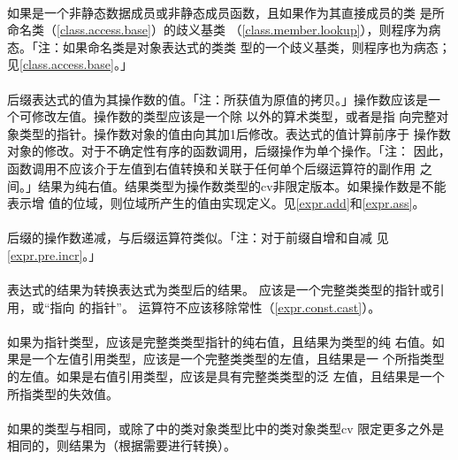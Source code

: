 \paragraph{}
如果是一个非静态数据成员或非静态成员函数，且如果作为其直接成员的类
是所命名类（\ref{class.access.base}）的歧义基类
（\ref{class.member.lookup}），则程序为病态。「注：如果命名类是对象表达式的类类
型的一个歧义基类，则程序也为病态；见\ref{class.access.base}。」

\paragraph{}
后缀\tm{++}表达式的值为其操作数的值。「注：所获值为原值的拷贝。」操作数应该是一
个可修改左值。操作数的类型应该是一个除 以外的算术类型，或者是指
向完整对象类型的指针。操作数对象的值由向其加1后修改。\tm{++}表达式的值计算前序于
操作数对象的修改。对于不确定性有序的函数调用，后缀\tm{++}操作为单个操作。「注：
因此，函数调用不应该介于左值到右值转换和关联于任何单个后缀\tm{++}运算符的副作用
之间。」结果为纯右值。结果类型为操作数类型的cv非限定版本。如果操作数是不能表示增
值的位域，则位域所产生的值由实现定义。见\ref{expr.add}和\ref{expr.ass}。

\paragraph{}
后缀\tm{\dsh\dsh}的操作数递减，与后缀\tm{++}运算符类似。「注：对于前缀自增和自减
见\ref{expr.pre.incr}。」

\paragraph{}
表达式的结果为转换表达式为类型后的结果。
应该是一个完整类类型的指针或引用，或``指向 的指针''。
运算符不应该移除常性（\ref{expr.const.cast}）。

\paragraph{}
如果为指针类型，应该是完整类类型指针的纯右值，且结果为类型的纯
右值。如果是一个左值引用类型，应该是一个完整类类型的左值，且结果是一
个所指类型的左值。如果是右值引用类型，应该是具有完整类类型的泛
左值，且结果是一个所指类型的失效值。

\paragraph{}
如果的类型与相同，或除了中的类对象类型比中的类对象类型cv
限定更多之外是相同的，则结果为（根据需要进行转换）。

